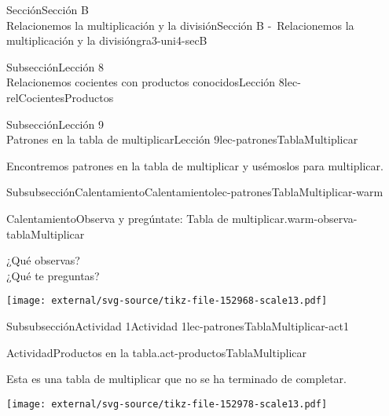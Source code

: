 \begin{sectionptx}{Sección}{{\Large Sección B\\}Relacionemos la multiplicación y la división}{}{Sección B -~Relacionemos la multiplicación y la división}{}{}{gra3-uni4-secB}
\begin{subsectionptx}{Subsección}{{\normalsize Lección 8\\[-0.05cm]}Relacionemos cocientes con productos conocidos}{}{Lección 8}{}{}{lec-relCocientesProductos}
\end{subsectionptx}
%
%
\typeout{************************************************}
\typeout{************************************************}
%
\begin{subsectionptx}{Subsección}{{\normalsize Lección 9\\[-0.05cm]}Patrones en la tabla de multiplicar}{}{Lección 9}{}{}{lec-patronesTablaMultiplicar}
\begin{introduction}{}%
Encontremos patrones en la tabla de multiplicar y usémoslos para multiplicar.%
\end{introduction}%
%
%
\typeout{************************************************}
\typeout{************************************************}
%
\begin{subsubsectionptx}{Subsubsección}{Calentamiento}{}{Calentamiento}{}{}{lec-patronesTablaMultiplicar-warm}
\begin{exploration}{Calentamiento}{Observa y pregúntate: Tabla de multiplicar.}{warm-observa-tablaMultiplicar}%
\begin{multicols}{2}
¿Qué observas?\\
 ¿Qué te preguntas?%
\vfill
\columnbreak
\begin{image}{0}{1}{0}{}%
\texttt{[image: external/svg-source/tikz-file-152968-scale13.pdf]}
\end{image}%
\end{multicols}
\end{exploration}%
\end{subsubsectionptx}
%
%
\typeout{************************************************}
\typeout{************************************************}
%
\begin{subsubsectionptx}{Subsubsección}{Actividad 1}{}{Actividad 1}{}{}{lec-patronesTablaMultiplicar-act1}
\begin{activity}{Actividad}{Productos en la tabla.}{act-productosTablaMultiplicar}%
\begin{multicols}{2}
Esta es una tabla de multiplicar que no se ha terminado de completar.%
\begin{image}{0}{1}{0}{}%
\texttt{[image: external/svg-source/tikz-file-152978-scale13.pdf]}
\end{image}%
%
\end{multicols}
\begin{enumerate}

\end{enumerate}
\end{activity}
\end{subsubsectionptx}
\end{subsectionptx}
\end{sectionptx}
